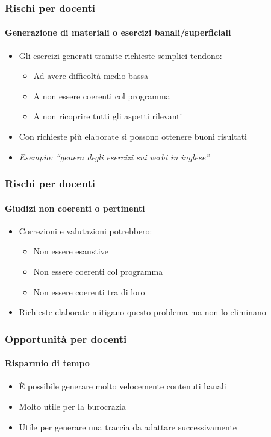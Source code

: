 \begin{contentframe}
    \frametitle{Rischi per docenti}
    \framesubtitle{Generazione di materiali o esercizi banali/superficiali}

    \begin{itemize}
        \item Gli esercizi generati tramite richieste semplici tendono:
        \begin{itemize}
            \item Ad avere difficoltà medio-bassa
            \item A non essere coerenti col programma
            \item A non ricoprire tutti gli aspetti rilevanti
        \end{itemize}

        \bigskip
        \item Con richieste più elaborate si possono ottenere buoni risultati
        
        \bigskip
        \item \textit{Esempio: ``genera degli esercizi sui verbi in inglese''}
    \end{itemize}
\end{contentframe}

\begin{contentframe}
    \frametitle{Rischi per docenti}
    \framesubtitle{Giudizi non coerenti o pertinenti}

    \begin{itemize}
        \item Correzioni e valutazioni potrebbero:
        \begin{itemize}
            \item Non essere esaustive
            \item Non essere coerenti col programma
            \item Non essere coerenti tra di loro
        \end{itemize}

        \bigskip
        \item Richieste elaborate mitigano questo problema ma non lo eliminano
    \end{itemize}
\end{contentframe}

\begin{contentframe}
    \frametitle{Opportunità per docenti}
    \framesubtitle{Risparmio di tempo}

    \begin{itemize}
        \item È possibile generare molto velocemente contenuti banali

        \bigskip
        \item Molto utile per la burocrazia
        \item Utile per generare una traccia da adattare successivamente
    \end{itemize}
\end{contentframe}


